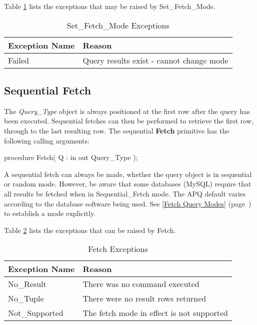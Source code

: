 \documentclass[english,letterpaper]{book}
\newcommand\Ref[1]{\textsection\ref{#1} (page~\pageref{#1})}
\begin{document}
Table \ref{t:sfmdx} lists the exceptions that may be raised by Set\_Fetch\_Mode.

\begin{table}
   \begin{center}
      \begin{tabular}{ll}
         Exception Name    &  Reason\\
         \hline 
         Failed            &  Query results exist - cannot change mode\\
      \end{tabular}
   \end{center}
   \caption{Set\_Fetch\_Mode Exceptions}\label{t:sfmdx}
\end{table}


\subsection{Sequential Fetch}

The \emph{Query\_Type} object is always positioned at the first row
after the query has been executed. Sequential fetches can then be
performed to retrieve the first row, through to the last resulting
row. The sequential \textbf{Fetch} primitive has the following calling
arguments:

\begin{Code}
procedure Fetch(
   Q : in out Query_Type
);
\end{Code}

A sequential fetch can always be made, whether the query object is
in sequential or random mode. However, be aware that some databases
(MySQL) require that all results be fetched when in Sequential\_Fetch
mode. The APQ default varies according to the database software being
used. See \Ref{Fetch Query Modes} to establish a mode explicitly.

Table \ref{t:fchx} lists the exceptions that can be raised by Fetch.

\begin{table}
   \begin{center}
      \begin{tabular}{ll}
         Exception Name    &  Reason\\
         \hline 
         No\_Result        &  There was no command executed\\
         No\_Tuple         &  There were no result rows returned\\
         Not\_Supported    &  The fetch mode in effect is not supported\\
      \end{tabular}
   \end{center}
   \caption{Fetch Exceptions}\label{t:fchx}
\end{table}
\end{document}
